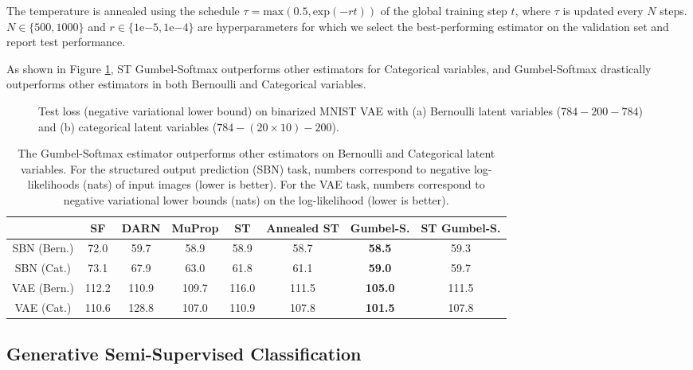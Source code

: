 \documentclass{article} %
\begin{document}
The temperature is annealed using the schedule $\tau = \text{max}(0.5,\text{exp}(-rt))$ of the global training step $t$, where $\tau$ is updated every $N$ steps. $N \in \{500,1000\}$ and $r \in \{1\mathrm{e}{-5},1\mathrm{e}{-4}\}$ are hyperparameters for which we select the best-performing estimator on the validation set and report test performance. 

As shown in Figure \ref{fig:vae_curves}, ST Gumbel-Softmax outperforms other estimators for Categorical variables, and Gumbel-Softmax drastically outperforms other estimators in both Bernoulli and Categorical variables.

\begin{figure}[h] 
  \centering
  \caption{Test loss (negative variational lower bound) on binarized MNIST VAE with (a) Bernoulli latent variables ($784-200-784$) and (b) categorical latent variables ($784-(20\times 10)-200$).}
  \label{fig:vae_curves}
\end{figure}

\begin{table}[ht]
\caption{The Gumbel-Softmax estimator outperforms other estimators on Bernoulli and Categorical latent variables. For the structured output prediction (SBN) task, numbers correspond to negative log-likelihoods (nats) of input images (lower is better). For the VAE task, numbers correspond to negative variational lower bounds (nats) on the log-likelihood (lower is better).}
\label{tab:results}
\begin{center}
 \begin{tabular}{c|c c c c c c c}
  				& SF & DARN & MuProp & ST & Annealed ST & Gumbel-S. & ST Gumbel-S. \\
 \hline
SBN (Bern.)	 & 72.0	& 59.7	& 58.9	& 58.9	& 58.7	& \textbf{58.5} & 59.3 \\
SBN (Cat.) & 73.1	 & 67.9 & 63.0 & 61.8 & 61.1	& \textbf{59.0}	& 59.7 \\
VAE (Bern.)	& 112.2	& 110.9	& 109.7	& 116.0	& 111.5	& \textbf{105.0}	& 111.5 \\
VAE (Cat.) &	110.6 & 128.8 & 107.0 & 110.9 & 107.8 & \textbf{101.5} & 107.8
  \end{tabular}
\end{center}
\end{table}

\subsection{Generative Semi-Supervised Classification}
\label{section:ssclass}
\end{document}
